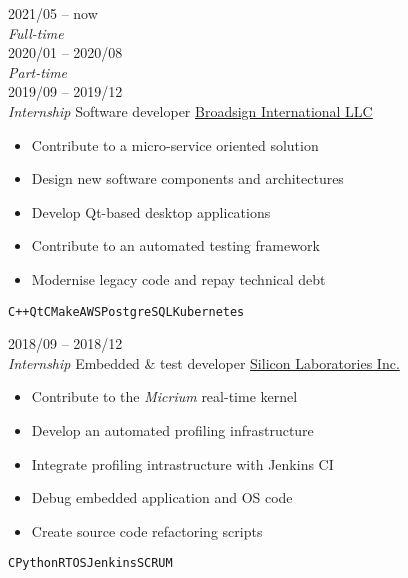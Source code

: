 \documentclass[9pt]{developercv} %
\begin{document}
\begin{minipage}[t]{0.8\textwidth}

\begin{entrylist}
	\entry
		{2021/05 -- now\\{\small\emph{Full-time}}\\2020/01 -- 2020/08\\{\small\emph{Part-time}}\\2019/09 -- 2019/12\\{\small\emph{Internship}}}
		{Software developer}
		{\href{https://broadsign.com/}{Broadsign International LLC}}
		{
			\vspace{-14pt}
			\begin{itemize}
				\renewcommand{\labelitemi}{\raisebox{.45ex}{\rule{.6ex}{.6ex}}}
				\setlength\itemsep{-1pt}
				\item Contribute to a micro-service oriented solution
				\item Design new software components and architectures
				\item Develop Qt-based desktop applications
				\item Contribute to an automated testing framework
				\item Modernise legacy code and repay technical debt
			\end{itemize}
			\vspace{-4pt}
			\texttt{C++}\slashsep\texttt{Qt}\slashsep\texttt{CMake}\slashsep\texttt{AWS}\slashsep\texttt{PostgreSQL}\slashsep\texttt{Kubernetes}
		}
	\entry
		{2018/09 -- 2018/12\\{\small\emph{Internship}}}
		{Embedded \& test developer}
		{\href{https://www.silabs.com/}{Silicon Laboratories Inc.}}
		{
			\vspace{-14pt}
			\begin{itemize}
				\renewcommand{\labelitemi}{\raisebox{.45ex}{\rule{.6ex}{.6ex}}}
				\setlength\itemsep{-1pt}
				\item Contribute to the \emph{Micrium} real-time kernel
				\item Develop an automated profiling infrastructure
				\item Integrate profiling intrastructure with Jenkins CI
				\item Debug embedded application and OS code
				\item Create source code refactoring scripts
			\end{itemize}
			\vspace{-4pt}
			\texttt{C}\slashsep\texttt{Python}\slashsep\texttt{RTOS}\slashsep\texttt{Jenkins}\slashsep\texttt{SCRUM}
}
\end{entrylist}
\end{minipage}
\end{document}
